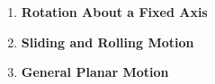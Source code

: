 \documentclass[11pt]{article}
\newcommand{\B}{\color{blue}}
\newcommand{\K}{\color{black}}
\begin{document}
\begin{itemize}
\newpage


	\begin{enumerate}
		\item \textbf{ Rotation About a \B Fixed Axis \K} \vspace{3mm} \\
		\newpage
		\item  \textbf{ \B Sliding \K and \B Rolling \K Motion} \vspace{3mm} \\
		\newpage
		\item  \textbf{ \B General Planar \K Motion} \vspace{3mm} \\
	
	\end{enumerate}




\end{itemize}


	
\end{document}
